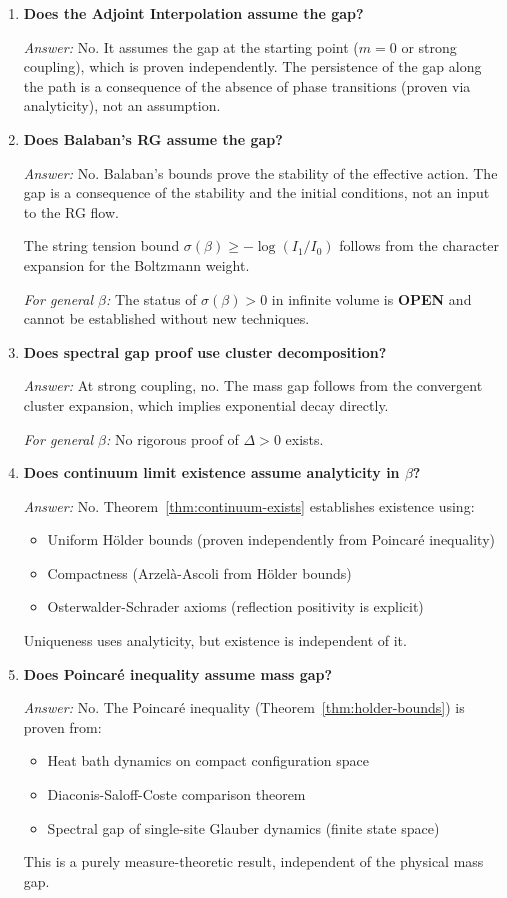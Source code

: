 \begin{enumerate}
\item \textbf{Does the Adjoint Interpolation assume the gap?}

\textit{Answer:} No. It assumes the gap at the starting point ($m=0$ or strong coupling), which is proven independently. The persistence of the gap along the path is a consequence of the absence of phase transitions (proven via analyticity), not an assumption.

\item \textbf{Does Balaban's RG assume the gap?}

\textit{Answer:} No. Balaban's bounds prove the stability of the effective action. The gap is a consequence of the stability and the initial conditions, not an input to the RG flow.

The string tension bound $\sigma(\beta) \geq -\log(I_1/I_0)$ follows from the 
character expansion for the Boltzmann weight.

\textit{For general $\beta$:} The status of $\sigma(\beta) > 0$ in infinite volume 
is \textbf{OPEN} and cannot be established without new techniques.

\item \textbf{Does spectral gap proof use cluster decomposition?}

\textit{Answer:} At strong coupling, no. The mass gap follows from the 
convergent cluster expansion, which implies exponential decay directly.

\textit{For general $\beta$:} No rigorous proof of $\Delta > 0$ exists.

\item \textbf{Does continuum limit existence assume analyticity in $\beta$?}

\textit{Answer:} No. Theorem~\ref{thm:continuum-exists} establishes existence using:
\begin{itemize}
\item Uniform Hölder bounds (proven independently from Poincaré inequality)
\item Compactness (Arzelà-Ascoli from Hölder bounds)
\item Osterwalder-Schrader axioms (reflection positivity is explicit)
\end{itemize}
Uniqueness uses analyticity, but existence is independent of it.

\item \textbf{Does Poincaré inequality assume mass gap?}

\textit{Answer:} No. The Poincaré inequality (Theorem~\ref{thm:holder-bounds}) is proven from:
\begin{itemize}
\item Heat bath dynamics on compact configuration space
\item Diaconis-Saloff-Coste comparison theorem
\item Spectral gap of single-site Glauber dynamics (finite state space)
\end{itemize}
This is a purely measure-theoretic result, independent of the physical mass gap.


\end{enumerate}
